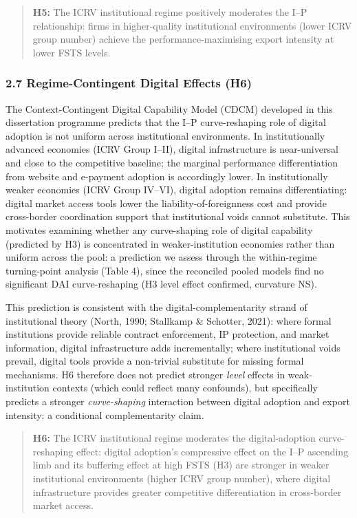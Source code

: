 \documentclass[
  12pt,a4paper]{article}
\begin{document}
\begin{quote}
\textbf{H5:} The ICRV institutional regime positively moderates the I--P
relationship: firms in higher-quality institutional environments (lower
ICRV group number) achieve the performance-maximising export intensity
at lower FSTS levels.
\end{quote}

\hypertarget{regime-contingent-digital-effects-h6}{%
\subsubsection{2.7 Regime-Contingent Digital Effects
(H6)}\label{regime-contingent-digital-effects-h6}}

The Context-Contingent Digital Capability Model (CDCM) developed in this
dissertation programme predicts that the I--P curve-reshaping role of
digital adoption is not uniform across institutional environments. In
institutionally advanced economies (ICRV Group I--II), digital
infrastructure is near-universal and close to the competitive baseline;
the marginal performance differentiation from website and e-payment
adoption is accordingly lower. In institutionally weaker economies (ICRV
Group IV--VI), digital adoption remains differentiating: digital market
access tools lower the liability-of-foreignness cost and provide
cross-border coordination support that institutional voids cannot
substitute. This motivates examining whether any curve-shaping role of
digital capability (predicted by H3) is concentrated in
weaker-institution economies rather than uniform across the pool: a
prediction we assess through the within-regime turning-point analysis
(Table 4), since the reconciled pooled models find no significant DAI
curve-reshaping (H3 level effect confirmed, curvature NS).

This prediction is consistent with the digital-complementarity strand of
institutional theory (North, 1990; Stallkamp \& Schotter, 2021): where
formal institutions provide reliable contract enforcement, IP
protection, and market information, digital infrastructure adds
incrementally; where institutional voids prevail, digital tools provide
a non-trivial substitute for missing formal mechanisms. H6 therefore
does not predict stronger \emph{level} effects in weak-institution
contexts (which could reflect many confounds), but specifically predicts
a stronger \emph{curve-shaping} interaction between digital adoption and
export intensity: a conditional complementarity claim.

\begin{quote}
\textbf{H6:} The ICRV institutional regime moderates the
digital-adoption curve-reshaping effect: digital adoption's compressive
effect on the I--P ascending limb and its buffering effect at high FSTS
(H3) are stronger in weaker institutional environments (higher ICRV
group number), where digital infrastructure provides greater competitive
differentiation in cross-border market access.
\end{quote}
\end{document}
